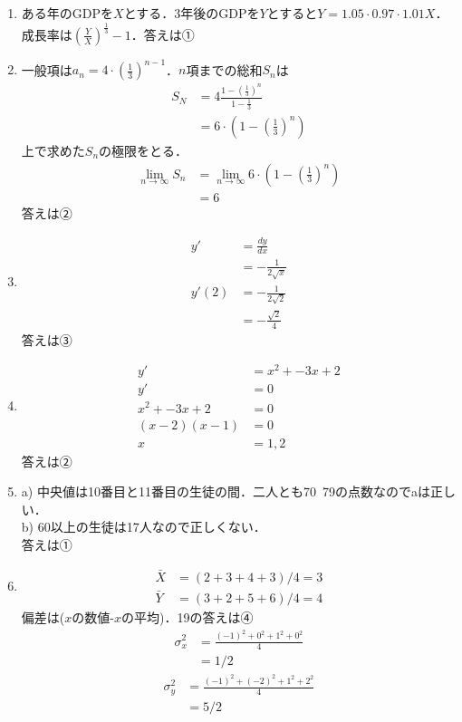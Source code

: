 \documentclass{ltjsarticle}
\begin{document}
\begin{enumerate}
  \item [設問11] ある年のGDPを$X$とする．3年後のGDPを$Y$とすると$Y=1.05 \cdot 0.97 \cdot 1.01　X$．成長率は$(\frac{Y}{X})^{\frac{1}{3}}-1$．答えは①
  \item [設問12] 一般項は$a_n = 4 \cdot (\frac{1}{3})^{n-1}$．$n$項までの総和$S_n$は
  \begin{align*}
    S_N &= 4\frac{1-(\frac{1}{3})^n}{1-\frac{1}{3}} \\
    &= 6\cdot (1-(\frac{1}{3})^n)
  \end{align*}
  上で求めた$S_n$の極限をとる．
  \begin{align*}
    \lim_{n\to \infty} S_n &= \lim_{n\to \infty} 6\cdot (1-(\frac{1}{3})^n) \\
    &= 6
  \end{align*}
  答えは②

  \item [設問14] 
  \begin{align}
    y' &= \frac{dy}{dx} \\
    &= -\frac{1}{2\sqrt{x}} \\
    y'(2) &= -\frac{1}{2\sqrt{2}} \\
    &= -\frac{\sqrt{2}}{4}
  \end{align}
  答えは③

  \item [設問15]
  \begin{align*}
    y' &= x^2+-3x+2 \\
    y' &= 0 \\
    x^2+-3x+2 &= 0 \\
    (x-2)(x-1) &= 0 \\
    x &= 1, 2
  \end{align*}
  答えは②

  \item [設問17]
  a) 中央値は10番目と11番目の生徒の間．二人とも70~79の点数なのでaは正しい．\\
  b) 60以上の生徒は17人なので正しくない．\\
  答えは①

  \item [設問18-22]
  \begin{align*}
    \bar{X} &= (2+3+4+3)/4 =3 \\
    \bar{Y} &= (3+2+5+6)/4 =4
  \end{align*}
  偏差は($x$の数値-$x$の平均)．19の答えは④
  \begin{align}
    \sigma^{2}_{x} &= \frac{(-1)^2+0^2+1^2+0^2}{4}\\
    &= 1/2
  \end{align}
  \begin{align}
    \sigma^{2}_{y} &= \frac{(-1)^2+(-2)^2+1^2+2^2}{4}\\
    &= 5/2
  \end{align}
  

\end{enumerate}
\end{document}
